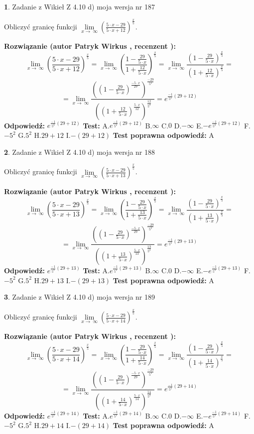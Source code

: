 \documentclass[12pt, a4paper]{article}
\theoremstyle{definition} %
\newtheorem{zad}{}
\newcommand{\zadStart}[1]{\begin{zad}#1\newline}
\newcommand{\zadStop}{\end{zad}}
\newcommand{\rozwStart}[2]{\noindent \textbf{Rozwiązanie (autor #1 , recenzent #2): }\newline}
\newcommand{\rozwStop}{\newline}
\newcommand{\odpStart}{\noindent \textbf{Odpowiedź:}\newline}
\newcommand{\odpStop}{\newline}
\newcommand{\testStart}{\noindent \textbf{Test:}\newline}
\newcommand{\testStop}{\newline}
\newcommand{\kluczStart}{\noindent \textbf{Test poprawna odpowiedź:}\newline}
\newcommand{\kluczStop}{\newline}
\begin{document}
\zadStart{Zadanie z Wikieł Z 4.10 d) moja wersja nr 187}


Obliczyć granicę funkcji  $\lim\limits_{x\to\ \infty}(\frac{5\cdot x-29}{5\cdot x+12})^{\frac{x}{5}}$.
\zadStop
\rozwStart{Patryk Wirkus}{}
$$\lim\limits_{x\to\ \infty}(\frac{5\cdot x-29}{5\cdot x+12})^{\frac{x}{5}} = \lim\limits_{x\to\ \infty}(\frac{1-\frac{29}{5\cdot x}}{1+\frac{12}{5\cdot x}})^{\frac{x}{5}}=\lim\limits_{x\to\ \infty}\frac{(1-\frac{29}{5\cdot x})^{\frac{x}{5}}}{(1+\frac{12}{5\cdot x})^{\frac{x}{5}}}=$$
$$=\lim\limits_{x\to\ \infty}\frac{((1-\frac{29}{5\cdot x})^{\frac{-5\cdot x}{29}})^{\frac{-29}{5^{2}}}}{((1+\frac{12}{5\cdot x})^{\frac{5\cdot x}{12}})^{\frac{12}{5^{2}}}}=e^{\frac{-1}{5^{2}}(29+12)}$$
\rozwStop
\odpStart
$e^{\frac{-1}{5^{2}}(29+12)}$
\odpStop
\testStart
A.$e^{\frac{-1}{5^{2}}(29+12)}$ B.$\infty$ C.$0$ D.$-\infty$ E.$-e^{\frac{-1}{5^{2}}(29+12)}$
F.$-5^{2}$ G.$5^{2}$
H.$29+12$
I.$-(29+12)$
\testStop
\kluczStart
A
\kluczStop



\zadStart{Zadanie z Wikieł Z 4.10 d) moja wersja nr 188}


Obliczyć granicę funkcji  $\lim\limits_{x\to\ \infty}(\frac{5\cdot x-29}{5\cdot x+13})^{\frac{x}{5}}$.
\zadStop
\rozwStart{Patryk Wirkus}{}
$$\lim\limits_{x\to\ \infty}(\frac{5\cdot x-29}{5\cdot x+13})^{\frac{x}{5}} = \lim\limits_{x\to\ \infty}(\frac{1-\frac{29}{5\cdot x}}{1+\frac{13}{5\cdot x}})^{\frac{x}{5}}=\lim\limits_{x\to\ \infty}\frac{(1-\frac{29}{5\cdot x})^{\frac{x}{5}}}{(1+\frac{13}{5\cdot x})^{\frac{x}{5}}}=$$
$$=\lim\limits_{x\to\ \infty}\frac{((1-\frac{29}{5\cdot x})^{\frac{-5\cdot x}{29}})^{\frac{-29}{5^{2}}}}{((1+\frac{13}{5\cdot x})^{\frac{5\cdot x}{13}})^{\frac{13}{5^{2}}}}=e^{\frac{-1}{5^{2}}(29+13)}$$
\rozwStop
\odpStart
$e^{\frac{-1}{5^{2}}(29+13)}$
\odpStop
\testStart
A.$e^{\frac{-1}{5^{2}}(29+13)}$ B.$\infty$ C.$0$ D.$-\infty$ E.$-e^{\frac{-1}{5^{2}}(29+13)}$
F.$-5^{2}$ G.$5^{2}$
H.$29+13$
I.$-(29+13)$
\testStop
\kluczStart
A
\kluczStop



\zadStart{Zadanie z Wikieł Z 4.10 d) moja wersja nr 189}


Obliczyć granicę funkcji  $\lim\limits_{x\to\ \infty}(\frac{5\cdot x-29}{5\cdot x+14})^{\frac{x}{5}}$.
\zadStop
\rozwStart{Patryk Wirkus}{}
$$\lim\limits_{x\to\ \infty}(\frac{5\cdot x-29}{5\cdot x+14})^{\frac{x}{5}} = \lim\limits_{x\to\ \infty}(\frac{1-\frac{29}{5\cdot x}}{1+\frac{14}{5\cdot x}})^{\frac{x}{5}}=\lim\limits_{x\to\ \infty}\frac{(1-\frac{29}{5\cdot x})^{\frac{x}{5}}}{(1+\frac{14}{5\cdot x})^{\frac{x}{5}}}=$$
$$=\lim\limits_{x\to\ \infty}\frac{((1-\frac{29}{5\cdot x})^{\frac{-5\cdot x}{29}})^{\frac{-29}{5^{2}}}}{((1+\frac{14}{5\cdot x})^{\frac{5\cdot x}{14}})^{\frac{14}{5^{2}}}}=e^{\frac{-1}{5^{2}}(29+14)}$$
\rozwStop
\odpStart
$e^{\frac{-1}{5^{2}}(29+14)}$
\odpStop
\testStart
A.$e^{\frac{-1}{5^{2}}(29+14)}$ B.$\infty$ C.$0$ D.$-\infty$ E.$-e^{\frac{-1}{5^{2}}(29+14)}$
F.$-5^{2}$ G.$5^{2}$
H.$29+14$
I.$-(29+14)$
\testStop
\kluczStart
A
\kluczStop
\end{document}
